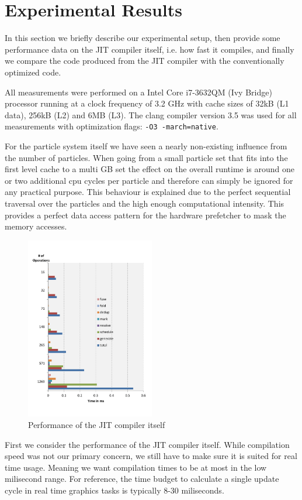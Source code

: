 \section{Experimental Results}\label{sec:exp}
In this section we briefly describe our experimental setup, then provide some performance data on the JIT compiler itself, i.e. how fast it compiles, and finally we compare the code produced from the JIT compiler with the conventionally optimized code.

All measurements were performed on a Intel Core i7-3632QM (Ivy Bridge) processor running at a clock frequency of 3.2 GHz with cache sizes of 32kB (L1 data), 256kB (L2) and 6MB (L3). The clang compiler version 3.5 was used for all measurements with optimization flags: \texttt{-O3 -march=native}.

For the particle system itself we have seen a nearly non-existing influence from the number of particles. When going from a small particle set that fits into the first level cache to a multi GB set the effect on the overall runtime is around one or two additional cpu cycles per particle and therefore can simply be ignored for any practical purpose. This behaviour is explained due to the perfect sequential traversal over the particles and the high enough computational intensity.
This provides a perfect data access pattern for the hardware prefetcher to mask the memory accesses.


\begin{figure}[t]\centering
  \includegraphics[width=0.5\textwidth]{jit_perf.pdf}
  \caption{Performance of the JIT compiler itself
  \label{perf_jit}}
\end{figure}
First we consider the performance of the JIT compiler itself. While compilation speed was not our primary concern, we still have to make sure it is suited for real time usage. Meaning we want compilation times to be at most in the low milisecond range. For reference, the time budget to calculate a single update cycle in real time graphics tasks is typically 8-30 miliseconds.

